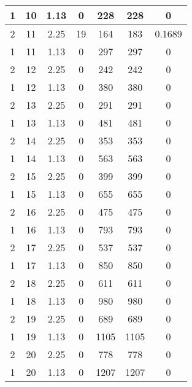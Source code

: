 \documentclass[letterpaper, 12pt]{article}
\begin{document}
\begin{longtable}{|c|c|c|c|c|c|c|}
\hline
1 & 10 & 1.13 & 0 & 228 & 228 & 0 \\
\hline
2 & 11 & 2.25 & 19 & 164 & 183 & 0.1689 \\
\hline
1 & 11 & 1.13 & 0 & 297 & 297 & 0 \\
\hline
2 & 12 & 2.25 & 0 & 242 & 242 & 0 \\
\hline
1 & 12 & 1.13 & 0 & 380 & 380 & 0 \\
\hline
2 & 13 & 2.25 & 0 & 291 & 291 & 0 \\
\hline
1 & 13 & 1.13 & 0 & 481 & 481 & 0 \\
\hline
2 & 14 & 2.25 & 0 & 353 & 353 & 0 \\
\hline
1 & 14 & 1.13 & 0 & 563 & 563 & 0 \\
\hline
2 & 15 & 2.25 & 0 & 399 & 399 & 0 \\
\hline
1 & 15 & 1.13 & 0 & 655 & 655 & 0 \\
\hline
2 & 16 & 2.25 & 0 & 475 & 475 & 0 \\
\hline
1 & 16 & 1.13 & 0 & 793 & 793 & 0 \\
\hline
2 & 17 & 2.25 & 0 & 537 & 537 & 0 \\
\hline
1 & 17 & 1.13 & 0 & 850 & 850 & 0 \\
\hline
2 & 18 & 2.25 & 0 & 611 & 611 & 0 \\
\hline
1 & 18 & 1.13 & 0 & 980 & 980 & 0 \\
\hline
2 & 19 & 2.25 & 0 & 689 & 689 & 0 \\
\hline
1 & 19 & 1.13 & 0 & 1105 & 1105 & 0 \\
\hline
2 & 20 & 2.25 & 0 & 778 & 778 & 0 \\
\hline
1 & 20 & 1.13 & 0 & 1207 & 1207 & 0 \\
\hline
\end{longtable}
\end{document}
